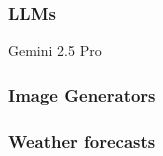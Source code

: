 \begin{frame}
    \frametitle{LLMs}
    
    \begin{figure}
       \centering
    \end{figure}

\end{frame}

\begin{frame}
    
    \begin{figure}
       \centering
    \end{figure}

\end{frame}


\begin{frame}
    
    \begin{figure}
       \centering
    \end{figure}

\end{frame}


\begin{frame}{Gemini 2.5 Pro}
    
    \begin{figure}
       \centering
    \end{figure}

\end{frame}

\begin{frame}
    \frametitle{Image Generators}
    
    \begin{figure}
       \centering
    \end{figure}

\end{frame}


\begin{frame}
    \frametitle{Weather forecasts}
    
    \begin{figure}
       \centering
    \end{figure}

\end{frame}


